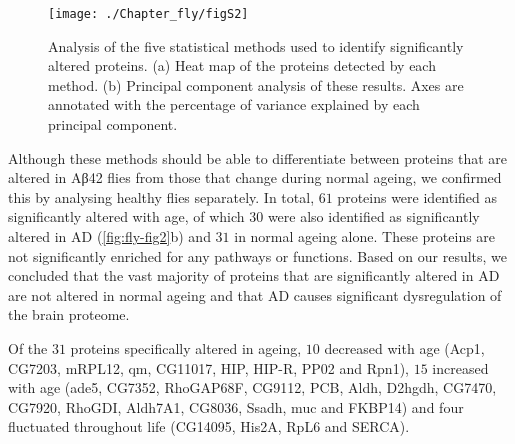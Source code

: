 \begin{figure}[!hbt]
    \centering
    \texttt{[image: ./Chapter\_fly/figS2]}
    \caption{%
        Analysis of the five statistical methods used to identify significantly altered proteins.
        (a) Heat map of the proteins detected by each method.
        (b) Principal component analysis of these results.
        Axes are annotated with the percentage of variance explained by each principal component.
    }
    \label{fig:fly-figS2}
\end{figure}


Although these methods should be able to differentiate between proteins that are altered in
Aβ42 flies from those that change during normal ageing,
we confirmed this by analysing healthy flies separately.
In total, $61$ proteins were identified as significantly altered with age,
of which $30$ were also identified
as significantly altered in AD (\ref{fig:fly-fig2}b) and $31$ in normal ageing alone.
These proteins are not significantly enriched for any pathways or functions.
Based on our results, we concluded that the vast majority of proteins
that are significantly altered in AD are not altered in normal ageing
and that AD causes significant dysregulation of the brain proteome.


Of the $31$ proteins specifically altered in ageing,
$10$ decreased with age (Acp1, CG7203, mRPL12, qm, CG11017, HIP, HIP-R, PP02 and Rpn1),
$15$ increased with age (ade5, CG7352, RhoGAP68F, CG9112, PCB, Aldh, D2hgdh, CG7470, CG7920,
RhoGDI, Aldh7A1, CG8036, Ssadh, muc and FKBP14)
and four fluctuated throughout life (CG14095, His2A, RpL6 and SERCA).


